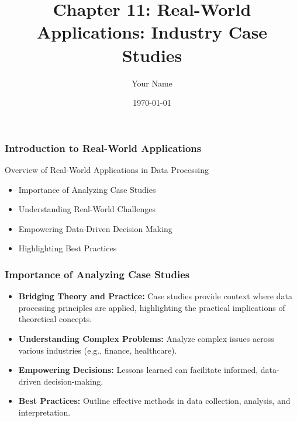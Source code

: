 \documentclass{beamer}
\title{Chapter 11: Real-World Applications: Industry Case Studies}
\author{Your Name}
\institute{Your Institution}
\date{\today}
\begin{document}
\frame{\titlepage}

\begin{frame}[fragile]
    \frametitle{Introduction to Real-World Applications}
    \begin{block}{Overview of Real-World Applications in Data Processing}
        \begin{itemize}
            \item Importance of Analyzing Case Studies
            \item Understanding Real-World Challenges
            \item Empowering Data-Driven Decision Making
            \item Highlighting Best Practices
        \end{itemize}
    \end{block}
\end{frame}

\begin{frame}[fragile]
    \frametitle{Importance of Analyzing Case Studies}
    \begin{itemize}
        \item \textbf{Bridging Theory and Practice:} Case studies provide context where data processing principles are applied, highlighting the practical implications of theoretical concepts.
        \item \textbf{Understanding Complex Problems:} Analyze complex issues across various industries (e.g., finance, healthcare).
        \item \textbf{Empowering Decisions:} Lessons learned can facilitate informed, data-driven decision-making.
        \item \textbf{Best Practices:} Outline effective methods in data collection, analysis, and interpretation.
    \end{itemize}
\end{frame}
\end{document}
